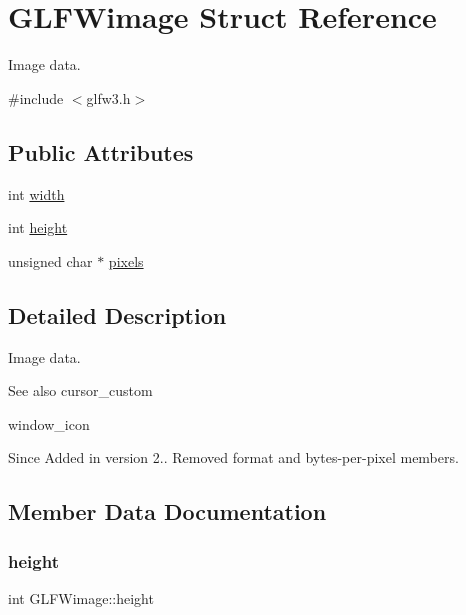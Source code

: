 \hypertarget{structGLFWimage}{}\section{G\+L\+F\+Wimage Struct Reference}
\label{structGLFWimage}


Image data.  




{\ttfamily \#include $<$glfw3.\+h$>$}

\subsection*{Public Attributes}
\begin{DoxyCompactItemize}
\item 
int \hyperlink{structGLFWimage_af6a71cc999fe6d3aea31dd7e9687d835}{width}
\item 
int \hyperlink{structGLFWimage_a0b7d95368f0c80d5e5c9875057c7dbec}{height}
\item 
unsigned char $\ast$ \hyperlink{structGLFWimage_a0c532a5c2bb715555279b7817daba0fb}{pixels}
\end{DoxyCompactItemize}


\subsection{Detailed Description}
Image data. 

\begin{DoxySeeAlso}{See also}
cursor\+\_\+custom 

window\+\_\+icon
\end{DoxySeeAlso}
\begin{DoxySince}{Since}
Added in version 2..  Removed format and bytes-\/per-\/pixel members. 
\end{DoxySince}


\subsection{Member Data Documentation}
\mbox{\label{structGLFWimage_a0b7d95368f0c80d5e5c9875057c7dbec}} 
\subsubsection{\texorpdfstring{height}{height}}
{\footnotesize\ttfamily int G\+L\+F\+Wimage\+::height}

